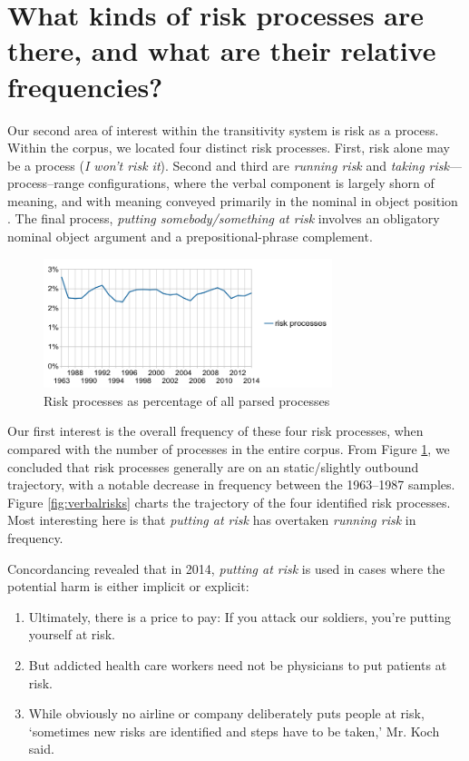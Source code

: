 		\section{What kinds of risk processes are there, and what are their relative frequencies?}
		\FloatBarrier

		Our second area of interest within the transitivity system is risk as a process. Within the corpus, we located four distinct risk processes. First, risk alone may be a process (\emph{I won't risk it}). Second and third are \emph{running risk} and \emph{taking risk}---process--range configurations, where the verbal component is largely shorn of meaning, and with meaning conveyed primarily in the nominal in object position \cite{halliday_introduction_2004}. The final process, \emph{putting somebody/something at risk} involves an obligatory nominal object argument and a prepositional-phrase complement.

			\begin{figure}[htb!]
			\centering
			\includegraphics[width=0.75\textwidth]{../images/riskprocesses.png}
			\caption{Risk processes as percentage of all parsed processes}
			\label{fig:riskprocesses}
			\end{figure}
			Our first interest is the overall frequency of these four risk processes, when compared with the number of processes in the entire corpus. From Figure \ref{fig:riskprocesses}, we concluded that risk processes generally are on an static/slightly outbound trajectory, with a notable decrease in frequency between the 1963--1987 samples. Figure \ref{fig:verbalrisks} charts the trajectory of the four identified risk processes. Most interesting here is that \emph{putting at risk} has overtaken \emph{running risk} in frequency.

            Concordancing revealed that in 2014, \emph{putting at risk} is used in cases where the potential harm is either implicit or explicit:

            \begin{enumerate}  [before=\itshape,font=\normalfont] \setlength\itemsep{0em} \small
                \item Ultimately, there is a price to pay: If you attack our soldiers, you're putting yourself at risk.
                \item But addicted health care workers need not be physicians to put patients at risk.
                \item While obviously no airline or company deliberately puts people at risk, `sometimes new risks are identified and steps have to be taken,' Mr. Koch said.
            \end{enumerate}

